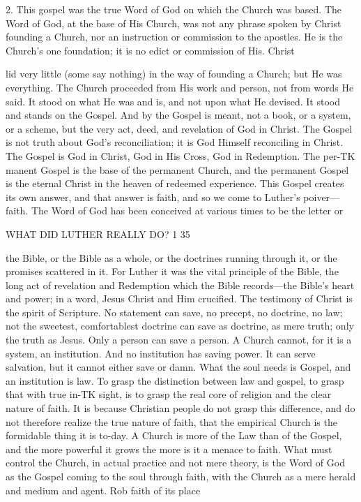 \documentclass[12pt,a5paper,oneside]{book}
\begin{document}
2. This gospel was the true Word of God on 
which the Church was based. The Word of God, at 
the base of His Church, was not any phrase spoken 
by Christ founding a Church, nor an instruction or 
commission to the apostles. He is the Church's one 
foundation; it is no edict or commission of His. 
Christ {lid very little (some say nothing) in the way 
of founding a Church; but He was everything. The 
Church proceeded from His work and person, not from 
words He said. It stood on what He was and is, and 
not upon what He devised. It stood and stands on 
the Gospel. And by the Gospel is meant, not a book, 
or a system, or a scheme, but the very act, deed, and 
revelation of God in Christ. The Gospel is not 
truth about God's reconciliation; it is God Himself 
reconciling in Christ. The Gospel is God in Christ, 
God in His Cross, God in Redemption. The per-TK
manent Gospel is the base of the permanent Church, 
and the permanent Gospel is the eternal Christ in the 
heaven of redeemed experience. This Gospel creates 
its own answer, and that answer is faith, and so we 
come to Luther's poiver---faith. The Word of God 
has been conceived at various times to be the letter or 



WHAT DID LUTHER REALLY DO? 1 35 

the Bible, or the Bible as a whole, or the doctrines 
running through it, or the promises scattered in it. 
For Luther it was the vital principle of the Bible, the 
long act of revelation and Redemption which the Bible 
records---the Bible's heart and power; in a word, 
Jesus Christ and Him crucified. The testimony of 
Christ is the spirit of Scripture. No statement can 
save, no precept, no doctrine, no law; not the 
sweetest, comfortablest doctrine can save as doctrine, 
as mere truth; only the truth as Jesus. Only a 
person can save a person. A Church cannot, for it is 
a system, an institution. And no institution has 
saving power. It can serve salvation, but it cannot 
either save or damn. What the soul needs is Gospel, 
and an institution is law. To grasp the distinction 
between law and gospel, to grasp that with true in-TK
sight, is to grasp the real core of religion and the clear 
nature of faith. It is because Christian people do not 
grasp this difference, and do not therefore realize the 
true nature of faith, that the empirical Church is the 
formidable thing it is to-day. A Church is more of 
the Law than of the Gospel, and the more powerful it 
grows the more is it a menace to faith. What must 
control the Church, in actual practice and not mere 
theory, is the Word of God as the Gospel coming to 
the soul through faith, with the Church as a mere 
herald and medium and agent. Rob faith of its place 



}
\end{document}
